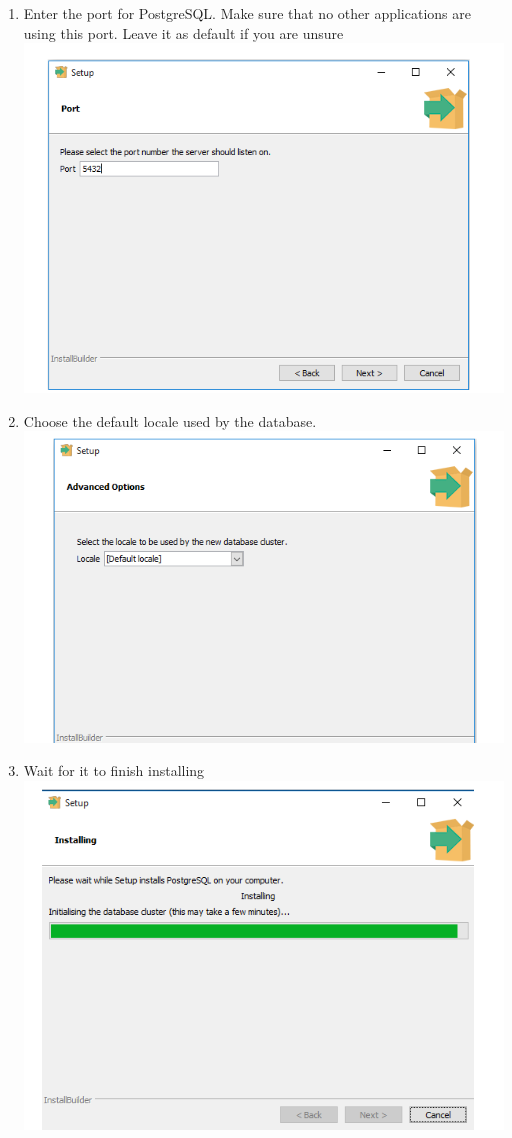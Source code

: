 \documentclass[a4paper,12pt]{article}
\begin{document}
\begin{enumerate}
\newpage
\item Enter the port for PostgreSQL. Make sure that no other applications are using this port. Leave it as default if you are unsure \\ 
\includegraphics[width=0.9\linewidth, center]{./Installation/postGresql3.PNG}\\[0.4cm]
\item Choose the default locale used by the database. \\ 
\includegraphics[width=0.9\linewidth, center]{./Installation/postGresql4.PNG}\\[0.4cm]
\newpage
\item Wait for it to finish installing \\ 
\includegraphics[width=0.9\linewidth, center]{./Installation/postGresql5.PNG}\\[0.4cm] 

\end{enumerate}
\end{document}
